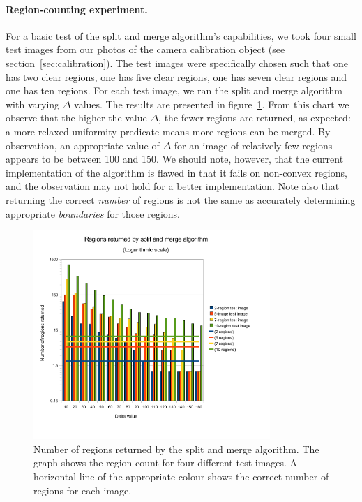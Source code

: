 \paragraph{Region-counting experiment.}
For a basic test of the split and merge algorithm's capabilities, we took four small test images from our photos of the camera calibration object (see section~\ref{sec:calibration}). The test images were specifically chosen such that one has two clear regions, one has five clear regions, one has seven clear regions and one has ten regions. For each test image, we ran the split and merge algorithm with varying $\Delta$ values. The results are presented in figure~\ref{fig:region-counts}. From this chart we observe that the higher the value $\Delta$, the fewer regions are returned, as expected: a more relaxed uniformity predicate means more regions can be merged. By observation, an appropriate value of $\Delta$ for an image of relatively few regions appears to be between 100 and 150. We should note, however, that the current implementation of the algorithm is flawed in that it fails on non-convex regions, and the observation may not hold for a better implementation. Note also that returning the correct \emph{number} of regions is not the same as accurately determining appropriate \emph{boundaries} for those regions.

\begin{figure}
  \centering
  \includegraphics[width=0.8\textwidth]{figures/region-counts}
  \caption[Regions returned by split and merge algorithm]{Number of regions returned by the split and merge algorithm. The graph shows the region count for four different test images. A horizontal line of the appropriate colour shows the correct number of regions for each image.}
  \label{fig:region-counts}
\end{figure}
